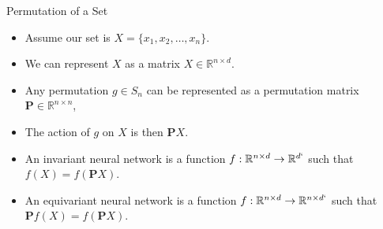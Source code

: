 \documentclass{beamer}
\begin{document}
\begin{frame}{Permutation of a Set}

    \begin{itemize}
        \setlength{\itemsep}{\fill}
        \item Assume our set is $X = \{x_1, x_2, \ldots, x_n\}$.
        \pause
        \item We can represent $X$ as a matrix $X \in \mathbb{R}^{n \times d}$.
        \pause
        \item Any permutation $g \in S_n$ can be represented as a permutation matrix $\boldsymbol{P} \in \mathbb{R}^{n \times n}$,
        \pause
        \item The action of $g$ on $X$ is then $\boldsymbol{P} X$.
        \pause
        \item An invariant neural network is a function $f: \mathbb{R}^{n \times d} \rightarrow \mathbb{R}^{d`}$ such that $f(X) = f(\boldsymbol{P}X)$.
        \pause
        \item An equivariant neural network is a function $f: \mathbb{R}^{n \times d} \rightarrow \mathbb{R}^{n \times d`}$ such that $\boldsymbol{P}f(X) = f(\boldsymbol{P}X)$.
    \end{itemize}
    
\end{frame}
\end{document}
